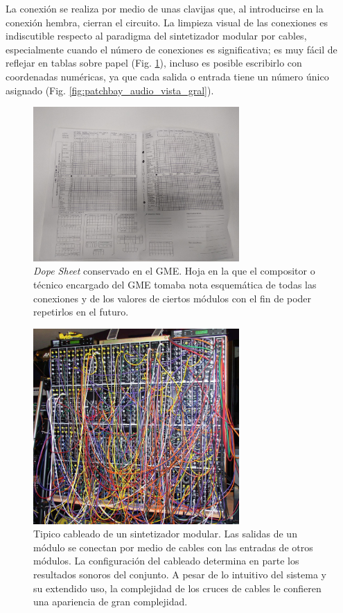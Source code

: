 La conexión se realiza por medio de unas clavijas que, al introducirse en la conexión hembra, cierran el circuito. La limpieza visual de las conexiones es indiscutible respecto al paradigma del sintetizador modular por cables, especialmente cuando el número de conexiones es significativa; es muy fácil de reflejar en tablas sobre papel (Fig. \ref{fig:dope_sheet_GME}), incluso es posible escribirlo con coordenadas numéricas, ya que cada salida o entrada tiene un número único asignado (Fig. \ref{fig:patchbay_audio_vista_gral}).

\begin{figure}
	\centering
	\includegraphics[width=0.7\textwidth]{images/dope_sheet_GME}
	\caption[\textit{Dope Sheet} conservado en el GME]{\textit{Dope Sheet} conservado en el GME. Hoja en la que el compositor o técnico encargado del GME tomaba nota esquemática de todas las conexiones y de los valores de ciertos módulos con el fin de poder repetirlos en el futuro.}
	\label{fig:dope_sheet_GME}
\end{figure}

\begin{figure}
	\centering
	\includegraphics[width=0.7\textwidth]{images/sinte_modular}
	\caption[Tipico cableado de un sintetizador modular]{Tipico cableado de un sintetizador modular. Las salidas de un módulo se conectan por medio de cables con las entradas de otros módulos. La configuración del cableado determina en parte los resultados sonoros del conjunto. A pesar de lo intuitivo del sistema y su extendido uso, la complejidad de los cruces de cables le confieren una apariencia de gran complejidad.}
	\label{fig:sintetizador_modular}
\end{figure}

